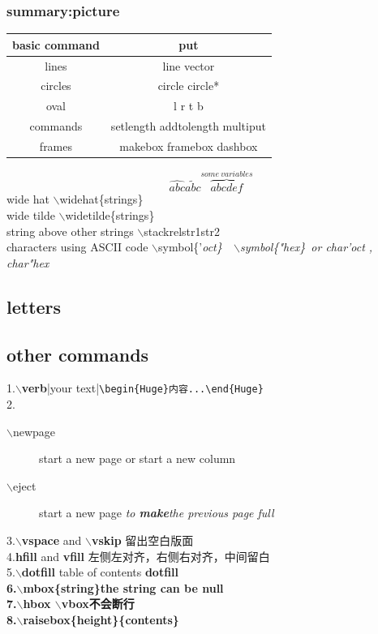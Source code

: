 \documentclass{article}[20pt]
\begin{document}
\subsubsection{summary:picture}
\begin{tabular}{|c|c|}\hline
	basic command & put\\\hline
	lines & line \vline vector \\\hline
	circles & circle \vline circle* \\\hline
	oval & l \vline \vline r \vline t \vline b \\ \hline
	commands & setlength \vline addtolength \vline multiput \\\hline
	frames & makebox \vline framebox \vline dashbox \\ \hline 
\end{tabular}
$$\widehat{abc}
\widetilde{abc}
\stackrel{some~variables}{\overbrace{abcdef}}
$$wide hat $\backslash$widehat\{strings\}\\
wide tilde $\backslash$widetilde\{strings\}\\
string above other strings $\backslash$stackrel{str1}{str2}\\
characters using ASCII code $\backslash$symbol\{'\it oct\}~~$\backslash$symbol\{"\it hex\}~or char'oct , char"hex\\
\subsection{letters}
\subsection{other commands}
1.{\bf$\backslash$verb}|your text|\verb|\begin{Huge}内容...\end{Huge}|\\
2.\begin{description}
	\item[$\backslash$newpage] start a new page or start a new column
	\item[$\backslash$eject] start a new page {\it to {\bf make}the previous page full}
\end{description}
3.{\bf$\backslash$vspace } and {\bf $\backslash$vskip} 留出空白版面\\
4.{\bf hfill}  and {\bf vfill} 左侧左对齐，右侧右对齐，中间留白\\
5.{\bf $\backslash$dotfill} table of contents \dotfill \bf dotfill\\
6.{\bf $\backslash$mbox\{string\}}the string can be null\\
7.{\bf $\backslash$hbox $\backslash$vbox}不会断行\\
8.{\bf $\backslash$raisebox\{height\}\{contents\}}\\
\end{document}

